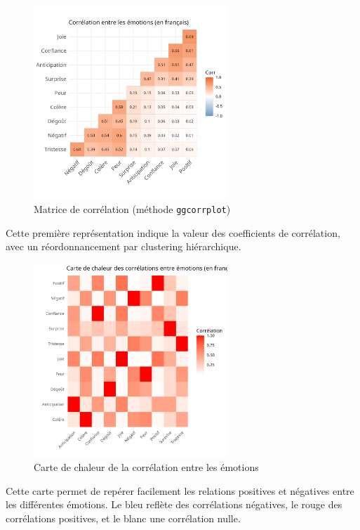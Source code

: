 \documentclass[12pt,a4paper]{article}
\begin{document}
	
	\begin{figure}[H]
		\centering
		\includegraphics[width=0.65\textwidth]{figures/correlation_ggcorrplot.png}
		\caption{Matrice de corrélation (méthode \texttt{ggcorrplot})}
		\label{fig:cor_ggcorrplot}
	\end{figure}
	
	Cette première représentation indique la valeur des coefficients de corrélation,
	avec un réordonnancement par clustering hiérarchique.
	
	
	\begin{figure}[H]
		\centering
		\includegraphics[width=0.65\textwidth]{figures/correlation_heatmap.png}
		\caption{Carte de chaleur de la corrélation entre les émotions}
		\label{fig:cor_heatmap}
	\end{figure}
	
	Cette carte permet de repérer facilement les relations positives et négatives
	entre les différentes émotions. Le bleu reflète des corrélations négatives,
	le rouge des corrélations positives, et le blanc une corrélation nulle.
	
\end{document}

